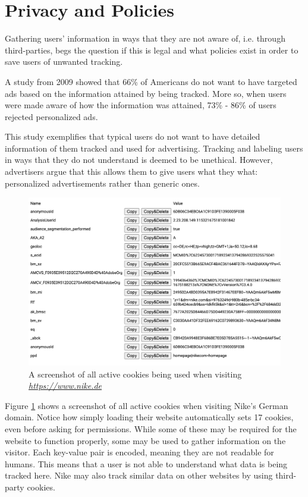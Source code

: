 %
%
\section{Privacy and Policies}
\label{sec:bg_cookies:privacy}

Gathering users' information in ways that they are not aware of, i.e. through third-parties, begs the question if this is legal and what policies exist in order to save users of unwanted tracking.

A study from 2009 showed that 66\% of Americans do not want to have targeted ads based on the information attained by being tracked. More so, when users were made aware of how the information was attained, 73\% - 86\% of users rejected personalized ads. \cite{americansRejectAds}

This study exemplifies that typical users do not want to have detailed information of them tracked and used for advertising. Tracking and labeling users in ways that they do not understand is deemed to be unethical. However, advertisers argue that this allows them to give users what they what: personalized advertisements rather than generic ones. \cite{americansRejectAds}

\begin{figure}[t]
\includegraphics[width=\textwidth]{./gfx/cookiesScreenshot.png}
\centering
\caption{A screenshot of all active cookies being used when visiting \textit{\url{https://www.nike.de}}}
\label{fig:nikeCookies}
\end{figure}

Figure \ref{fig:nikeCookies} shows a screenshot of all active cookies when visiting Nike's German domain. Notice how simply loading their website automatically sets 17 cookies, even before asking for permissions. While some of these may be required for the website to function properly, some may be used to gather information on the visitor. Each key-value pair is encoded, meaning they are not readable for humans. This means that a user is not able to understand what data is being tracked here. Nike may also track similar data on other websites by using third-party cookies.






